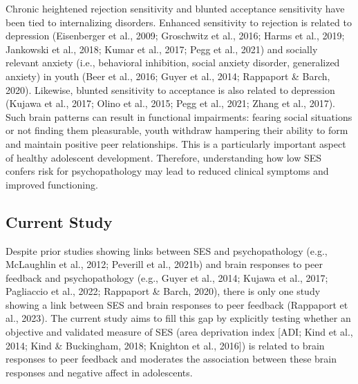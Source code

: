 \documentclass[
  man]{apa7}
\begin{document}
Chronic heightened rejection sensitivity and blunted acceptance sensitivity have been tied to internalizing disorders. Enhanced sensitivity to rejection is related to depression (Eisenberger et al., 2009; Groschwitz et al., 2016; Harms et al., 2019; Jankowski et al., 2018; Kumar et al., 2017; Pegg et al., 2021) and socially relevant anxiety (i.e., behavioral inhibition, social anxiety disorder, generalized anxiety) in youth (Beer et al., 2016; Guyer et al., 2014; Rappaport \& Barch, 2020). Likewise, blunted sensitivity to acceptance is also related to depression (Kujawa et al., 2017; Olino et al., 2015; Pegg et al., 2021; Zhang et al., 2017). Such brain patterns can result in functional impairments: fearing social situations or not finding them pleasurable, youth withdraw hampering their ability to form and maintain positive peer relationships. This is a particularly important aspect of healthy adolescent development. Therefore, understanding how low SES confers risk for psychopathology may lead to reduced clinical symptoms and improved functioning.

\hypertarget{current-study}{%
\subsection{Current Study}\label{current-study}}

Despite prior studies showing links between SES and psychopathology (e.g., McLaughlin et al., 2012; Peverill et al., 2021b) and brain responses to peer feedback and psychopathology (e.g., Guyer et al., 2014; Kujawa et al., 2017; Pagliaccio et al., 2022; Rappaport \& Barch, 2020), there is only one study showing a link between SES and brain responses to peer feedback (Rappaport et al., 2023). The current study aims to fill this gap by explicitly testing whether an objective and validated measure of SES (area deprivation index {[}ADI; Kind et al., 2014; Kind \& Buckingham, 2018; Knighton et al., 2016{]}) is related to brain responses to peer feedback and moderates the association between these brain responses and negative affect in adolescents.
\end{document}
